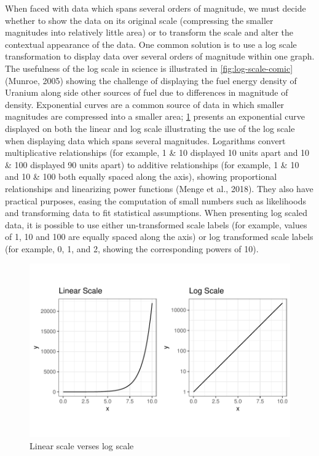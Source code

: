 \documentclass[print]{nuthesis}
\begin{document}
When faced with data which spans several orders of magnitude, we must decide whether to show the data on its original scale (compressing the smaller magnitudes into relatively little area) or to transform the scale and alter the contextual appearance of the data.
One common solution is to use a log scale transformation to display data over several orders of magnitude within one graph.
The usefulness of the log scale in science is illustrated in \cref{fig:log-scale-comic} (Munroe, 2005) showing the challenge of displaying the fuel energy density of Uranium along side other sources of fuel due to differences in magnitude of density.
Exponential curves are a common source of data in which smaller magnitudes are compressed into a smaller area;
\cref{fig:log-scales} presents an exponential curve displayed on both the linear and log scale illustrating the use of the log scale when displaying data which spans several magnitudes.
Logarithms convert multiplicative relationships (for example, 1 \& 10 displayed 10 units apart and 10 \& 100 displayed 90 units apart) to additive relationships (for example, 1 \& 10 and 10 \& 100 both equally spaced along the axis), showing proportional relationships and linearizing power functions (Menge et al., 2018).
They also have practical purposes, easing the computation of small numbers such as likelihoods and transforming data to fit statistical assumptions.
When presenting log scaled data, it is possible to use either un-transformed scale labels (for example, values of 1, 10 and 100 are equally spaced along the axis) or log transformed scale labels (for example, 0, 1, and 2, showing the corresponding powers of 10).

\begin{figure}[tbp]

{\centering \includegraphics[width=1\linewidth,]{thesis_files/figure-latex/log-scales-1} 

}

\caption{Linear scale verses log scale}\label{fig:log-scales}
\end{figure}
\end{document}
